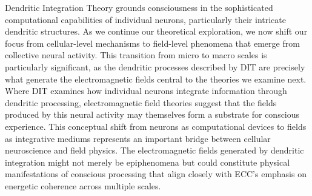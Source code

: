 Dendritic Integration Theory grounds consciousness in the sophisticated computational capabilities of individual neurons, particularly their intricate dendritic structures. As we continue our theoretical exploration, we now shift our focus from cellular-level mechanisms to field-level phenomena that emerge from collective neural activity. This transition from micro to macro scales is particularly significant, as the dendritic processes described by DIT are precisely what generate the electromagnetic fields central to the theories we examine next. Where DIT examines how individual neurons integrate information through dendritic processing, electromagnetic field theories suggest that the fields produced by this neural activity may themselves form a substrate for conscious experience. This conceptual shift from neurons as computational devices to fields as integrative mediums represents an important bridge between cellular neuroscience and field physics. The electromagnetic fields generated by dendritic integration might not merely be epiphenomena but could constitute physical manifestations of conscious processing that align closely with ECC's emphasis on energetic coherence across multiple scales.
